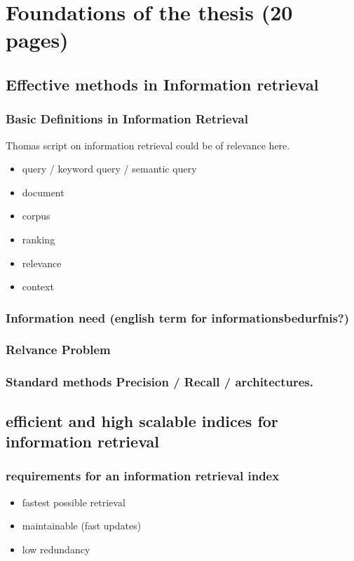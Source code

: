 \documentclass[•]{book}
\begin{document}
\chapter{Foundations of the thesis (20 pages)}
\section{Effective methods in Information retrieval}
\subsection{Basic Definitions in Information Retrieval}
Thomas script on information retrieval could be of relevance here.
\begin{itemize}
\item query / keyword query / semantic query
\item document
\item corpus
\item ranking
\item relevance
\item context
\end{itemize}
\subsection{Information need (english term for informationsbedurfnis?)}
\subsection{Relvance Problem}
\subsection{Standard methods Precision / Recall / architectures.}
\section{efficient and high scalable indices for information retrieval}
\subsection{requirements for an information retrieval index}
\begin{itemize}
\item fastest possible retrieval
\item maintainable (fast updates)
\item low redundancy
\end{itemize}
\end{document}
